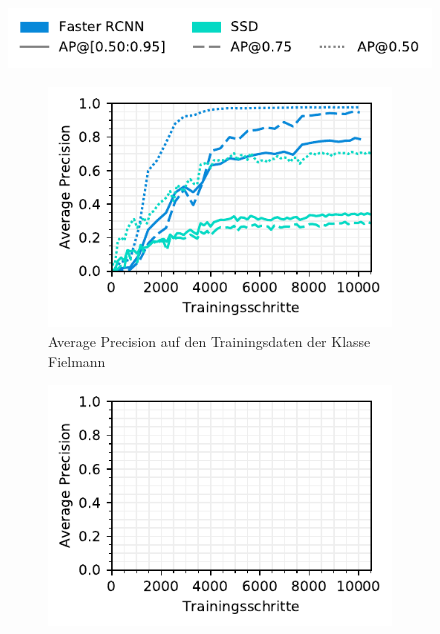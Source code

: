 \begin{figure}[h!] 
  \captionsetup{width=.9\linewidth}
  \caption{TODO}
  \label{fig:specific-ie}
  \centering
  \includegraphics[scale=1]{graphics/matplot/img-detection__legend_3.pdf}
  \begin{subfigure}[b]{0.45\linewidth}
    \centering
    \includegraphics[scale=1]{graphics/matplot/img-detection__fielmann__ap__train.pdf}
    \caption{Average Precision auf den Trainingsdaten der Klasse Fielmann} 
    \label{fig:specific-ie:fielmann:ap_train}
    \vspace{2ex}
  \end{subfigure}%
  \begin{subfigure}[b]{0.45\linewidth}
    \centering
    \includegraphics[scale=1]{graphics/matplot/img-detection__visilab__ap.pdf}

\end{subfigure}
\end{figure}
